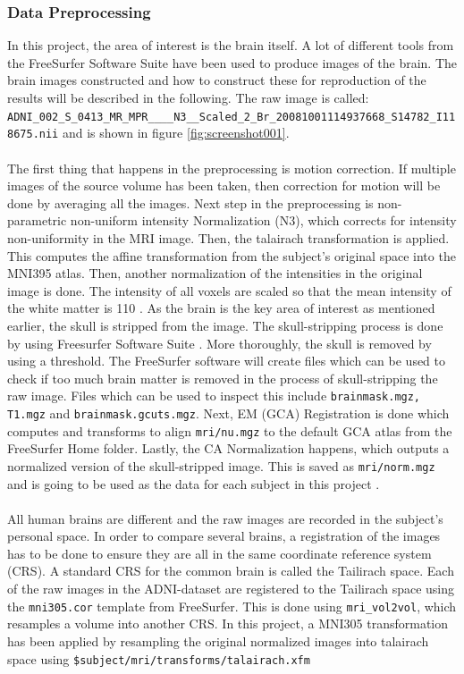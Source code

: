 \documentclass[12pt, fleqn, titlepage]{article}
\newcommand{\1}[1]{\mathds{1}\left[#1\right]}
\begin{document}
\subsubsection{Data Preprocessing}

In this project, the area of interest is the brain itself. A lot of different tools from the FreeSurfer Software Suite have been used to produce images of the brain. The brain images constructed and how to construct these for reproduction of the results will be described in the following. The raw image is called: \newline \texttt{
ADNI\_002\_S\_0413\_MR\_MPR\_\_\_\_N3\_\_Scaled\_2\_Br\_20081001114937668\_S14782\_I118675.nii} and is shown in figure \ref{fig:screenshot001}. 
\\\\
The first thing that happens in the preprocessing is motion correction. If multiple images of the source volume has been taken, then correction for motion will be done by averaging all the images.
Next step in the preprocessing is non-parametric non-uniform intensity Normalization (N3), which corrects for intensity non-uniformity in the MRI image.
Then, the talairach transformation is applied. This computes the affine transformation from the subject's original space into the MNI395 atlas.
Then, another normalization of the intensities in the original image is done. The intensity of all voxels are scaled so that the mean intensity of the white matter is 110 \cite{normalize}. 
As the brain is the key area of interest as mentioned earlier, the skull is stripped from the image. The skull-stripping process is done by using Freesurfer Software Suite \cite{freesurfer}.
More thoroughly, the skull is removed by using a threshold.
The FreeSurfer software will create files which can be used to check if too much brain matter is removed in the process of skull-stripping the raw image.
Files which can be used to inspect this include \texttt{brainmask.mgz, T1.mgz} and \texttt{brainmask.gcuts.mgz}.
Next, EM (GCA) Registration is done which computes and transforms to align
\texttt{mri/nu.mgz} to the default GCA atlas from the FreeSurfer Home folder. Lastly, the CA Normalization happens, which outputs a normalized version of the skull-stripped image. This is saved as \texttt{mri/norm.mgz} and is going to be used as the data for each subject in this project \cite{reckon}.
\\\\
All human brains are different and the raw images are recorded in the subject's personal space. 
In order to compare several brains, a registration of the images has to be done to ensure they are all in the same coordinate reference system (CRS). 
A standard CRS for the common brain is called the Tailirach space. 
Each of the raw images in the ADNI-dataset are registered to the Tailirach space using the \texttt{mni305.cor} template from FreeSurfer. 
This is done using \texttt{mri\_vol2vol}, which resamples a volume into another CRS. 
In this project, a MNI305 transformation has been applied by resampling the original normalized images into talairach space using \texttt{\$subject/mri/transforms/talairach.xfm} 
\end{document}
